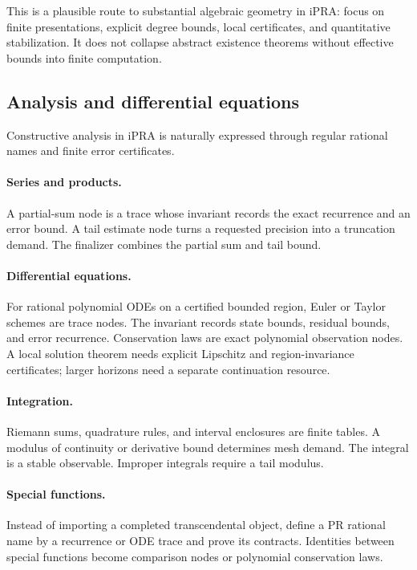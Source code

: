 This is a plausible route to substantial algebraic geometry in iPRA: focus on
finite presentations, explicit degree bounds, local certificates, and
quantitative stabilization.  It does not collapse abstract existence theorems
without effective bounds into finite computation.

\subsection{Analysis and differential equations}

Constructive analysis in iPRA is naturally expressed through regular rational
names and finite error certificates.

\paragraph{Series and products.}
A partial-sum node is a trace whose invariant records the exact recurrence and
an error bound.  A tail estimate node turns a requested precision into a
truncation demand.  The finalizer combines the partial sum and tail bound.

\paragraph{Differential equations.}
For rational polynomial ODEs on a certified bounded region, Euler or Taylor
schemes are trace nodes.  The invariant records state bounds, residual bounds,
and error recurrence.  Conservation laws are exact polynomial observation
nodes.  A local solution theorem needs explicit Lipschitz and region-invariance
certificates; larger horizons need a separate continuation resource.

\paragraph{Integration.}
Riemann sums, quadrature rules, and interval enclosures are finite tables.  A
modulus of continuity or derivative bound determines mesh demand.  The
integral is a stable observable.  Improper integrals require a tail modulus.

\paragraph{Special functions.}
Instead of importing a completed transcendental object, define a PR rational
name by a recurrence or ODE trace and prove its contracts.  Identities between
special functions become comparison nodes or polynomial conservation laws.

